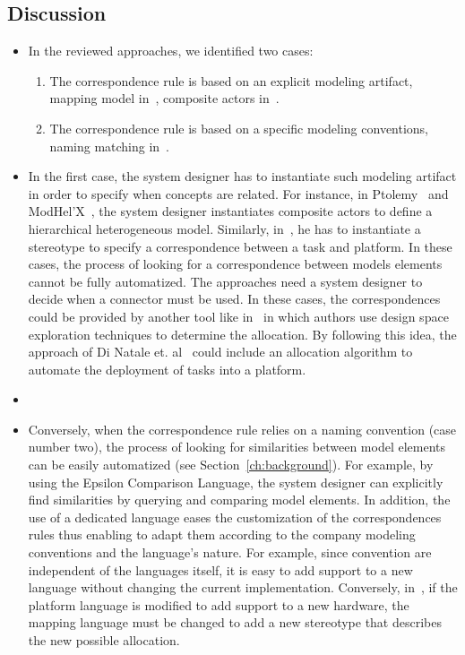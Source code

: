 	\subsection{Discussion}
	\begin{itemize} 
			\item In the reviewed approaches, we identified two cases:
			\begin{enumerate}
				\item The correspondence rule is based on an explicit modeling artifact, \eg mapping model in~\cite{dinatale}, composite actors in~\cite{modhelxbib, ptoleframebib}. 	
				\item The correspondence rule is based on a specific modeling conventions, \eg naming matching in~\cite{mascotbib}.
			\end{enumerate}
				
			\item In the first case, the system designer has to instantiate such modeling artifact in order to specify when concepts are related. For instance, in Ptolemy~\cite{ptoleframebib} and ModHel'X~\cite{modhelxbib}, the system designer instantiates composite actors to define a hierarchical heterogeneous model. Similarly, in~\cite{dinatale}, he has to instantiate a stereotype to specify a correspondence between a task and platform. In these cases, the process of looking for a correspondence between models elements cannot be fully automatized. The approaches need a system designer to decide when a connector must be used. In these cases, the correspondences could be provided by another tool like in~\cite{kofmanbib} in which authors use design space exploration techniques to determine the allocation. By following this idea, the approach of Di Natale et. al~\cite{dinatale} could include an allocation algorithm to automate the deployment of tasks into a platform. 
			
			\item {}
			\item Conversely, when the correspondence rule relies on a naming convention (case number two), the process of looking for similarities between model elements can be easily automatized (see Section~\ref{ch:background}). For example, by using the Epsilon Comparison Language, the system designer can explicitly find similarities by querying and comparing model elements. In addition, the use of a dedicated language eases the customization of the correspondences rules thus enabling to adapt them according to the company modeling conventions and the language's nature. For example, since convention are independent of the languages itself, it is easy to add support to a new language without changing the current implementation. Conversely, in~\cite{dinatale}, if the platform language is modified to add support to a new hardware, the mapping language must be changed to add a new stereotype that describes the new possible allocation. 
			
			\end{itemize}
			
